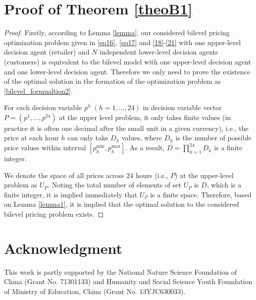 \documentclass[10pt,journal]{IEEEtran}
\theoremstyle{definition}
\theoremstyle{plain} \newtheorem{theo}{Theorem} \newtheorem{prop}{Proposition}  \newtheorem{lemm}{Lemma}
\begin{document}
\section{Proof of Theorem \ref{theoB1}} \label{appendix C}

\begin{proof}
Firstly, according to Lemma \ref{lemma}, our considered bilevel pricing optimization problem given in \eqref{eq16}, \eqref{eq17} and \eqref{18}-\eqref{21} with one upper-level decision agent (retailer) and $N$ independent lower-level decision agents (customers) is equivalent to the bilevel model with one upper-level decision agent and one lower-level decision agent. Therefore we only need to prove the existence of the optimal solution in the formation of the optimization problem as \eqref{bilevel_formualtion2}. 



For each decision variable $p^{h} \; (h=1,...,24)$ in decision variable vector $P =\left(p^{1} ,...,p^{24} \right)$ at the upper level problem, it only takes finite values (in practice it is often one decimal after the small unit in a given currency), i.e., the price at each hour $h$ can only take $D_{h}$ values, where $D_{h}$ is the number of possible price values within interval $[p_{h}^{\min }, p_{h}^{\max }]$. As a result, $D=\prod_{h=1}^{24}D_{h}$ is a finite integer. 

We denote the space of all prices across 24 hours (i.e., $P$) at the upper-level problem as $U_P$. Noting the total number of elements of set $U_P$ is $D$, which is a finite integer, it is implied immediately that $U_P$ is a finite space. Therefore, based on Lemma \ref{lemma1}, it is implied that the optimal solution to the considered bilevel pricing problem exists.

\end{proof}

\section*{Acknowledgment}

This work is partly supported by the National Nature Science Foundation of China (Grant No. 71301133) and Humanity and Social Science Youth Foundation of Ministry of Education, China (Grant No. 13YJC630033).

\balance







\end{document}
